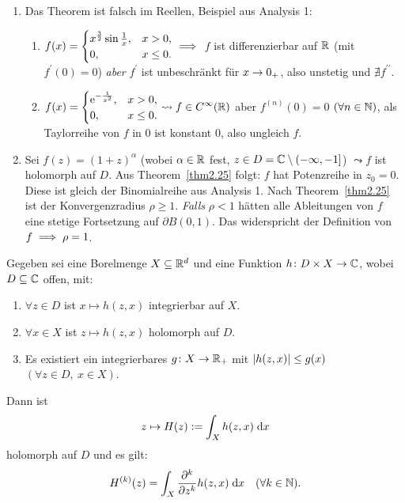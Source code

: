 \documentclass[a4paper,twoside,DIV15,BCOR12mm]{scrbook}
\begin{document}
\begin{bsp}\label{bsp2.26}\begin{enumerate}
\item Das Theorem ist falsch im Reellen, Beispiel aus Analysis 1:
\begin{enumerate}
\item $\displaystyle f(x)=\begin{cases}x^{\frac{3}{2}}\sin\frac{1}{x},&x>0,\\0,&x\leq 0.\end{cases}\implies$ $f$ ist differenzierbar auf $\mathbb{R}$ (mit $f^\prime(0) = 0$) \textit{aber} $f^\prime$ ist unbeschränkt für $x\rightarrow 0_+$, also unstetig und $\nexists f^{\prime\prime}$.

\item $\displaystyle f(x)=\begin{cases}\mathrm{e}^{-\frac{1}{x^2}},&x>0,\\0,&x\leq0.\end{cases}\leadsto f\in C^\infty(\mathbb{R})$ aber $f^{(n)}(0)=0$ $(\forall n\in\mathbb{N})$, als Taylorreihe von $f$ in $0$ ist konstant 0, also ungleich $f$.
\end{enumerate}
\item Sei $f(z)=(1+z)^\alpha$ (wobei $\alpha\in\mathbb{R}$ fest, $z\in D = \mathbb{C}\setminus(-\infty,-1]$) $\leadsto f$ ist holomorph auf $D$. Aus Theorem~\ref{thm2.25} folgt: $f$ hat Potenzreihe in $z_0=0$. Diese ist gleich der Binomialreihe aus Analysis 1. Nach Theorem~\ref{thm2.25} ist der Konvergenzradius $\rho\geq 1$. \textit{Falls} $\rho <1$ hätten alle Ableitungen von $f$ eine stetige Fortsetzung auf $\partial B(0,1)$. Das widerspricht der Definition von $f\implies\rho=1$.
\end{enumerate}
\end{bsp}

\begin{kor}\label{kor2.27}
Gegeben sei eine Borelmenge $X\subseteq\mathbb{R}^d$ und eine Funktion $h\colon D\times X\to\mathbb{C}$, wobei $D\subseteq\mathbb{C}$ offen, mit:
\begin{enumerate}
\item $\forall z\in D$ ist $x\mapsto h(z,x)$ integrierbar auf $X$.
\item $\forall x\in X$ ist $z\mapsto h(z,x)$ holomorph auf $D$.
\item Es existiert ein integrierbares $g\colon X\to\mathbb{R}_+$ mit $\left\lvert h(z,x)\right\lvert\leq g(x)$ $(\forall z\in D,\ x\in X)$.
\end{enumerate}
Dann ist \[z\mapsto H(z):= \int_{X}^{}{h(z,x)}\;\mathrm{d} x\] holomorph auf $D$ und es gilt:
\[H^{(k)}(z)=\int_{X}^{}{\frac{\partial^k}{\partial z^k}h(z,x)}\;\mathrm{d} x\quad(\forall k\in\mathbb{N}).\]
\end{kor}
\end{document}
